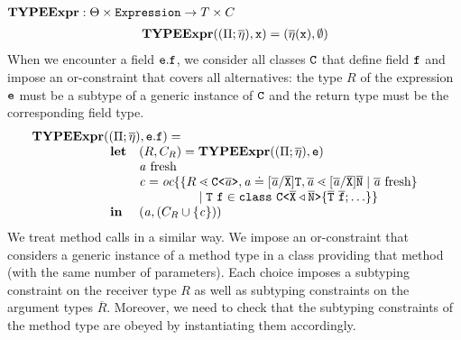 \documentclass[a4paper,USenglish,cleveref, autoref, thm-restate]{lipics-v2021}
\begin{document}
\noindent
$\textbf{TYPEExpr}: \Theta \times
\texttt{Expression} \rightarrow {T} \times C
$
\begin{gather*}
  \textbf{TYPEExpr} (({\Pi} ; 
  \overline{\mathtt{\eta}}), \mathtt{x}) =
  (\overline{\mathtt{\eta}} ({\tt x}) , \emptyset)
\end{gather*}
When we encounter a field ${\tt e}.{\tt f}$, we consider all classes
${\tt C}$
that define field ${\tt f}$ and impose an or-constraint that covers all
alternatives: the type $R$ of the expression ${\tt e}$ must be a subtype of a generic instance
of ${\tt C}$ and the return type must be the corresponding field type. 
\begin{gather*}
  \begin{array}{@{}l@{}l}
    \typeExpr{} &(({\mtypeEnvironment} ;
                  \overline{\localVarAssumption}), \texttt{e}.\texttt{f}) = \\
                & \begin{array}{ll}
                    \textbf{let} 
                    & ({R}, \consSet_R) = \typeExpr(({\mtypeEnvironment} ;
                      \overline{\localVarAssumption}), \texttt{e})\\
                    & \tv{a} \text{ fresh} \\
                    & \constraint = \begin{array}[t]{@{}l@{}l}
                      \orCons\set{
                      \set{ &
                      {R} \lessdot \exptype{C}{\ol{\tv{a}}} , \tv{a} \doteq
                      [\overline{\tv{a}}/\ol{X}]\type{T} , \ol{\tv{a}} \lessdot [\overline{\tv{a}}/\ol{X}]\ol{N}
                      \mid \overline{\tv{a}} \text{ fresh}
                      } \\
                      & \quad \mid \mv{T}\ \mv{f} \in \texttt{class}\ \exptype{C}{\ol{X} \triangleleft \ol{N}} \set{ \ol{T}\ \ol{f}; \ldots}
                      }\end{array}\\
                    {\mathbf{in}} & {
                    (\tv{a}, (\consSet_R \cup \set{\constraint}))}
                  \end{array} 
  \end{array}
\end{gather*}
We treat method calls in a similar way. We impose an or-constraint
that considers a generic instance of a method type in a class
providing that method (with the same number of parameters). Each
choice imposes a subtyping constraint on the receiver type  $R$ as
well as subtyping constraints on the argument types
$\overline{R}$. Moreover, we need to check that the subtyping
constraints of the method type are obeyed by instantiating them
accordingly.
\end{document}

